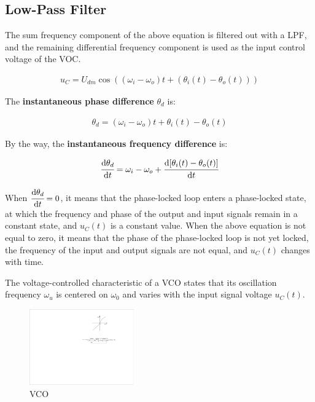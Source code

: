 \subsection*{Low-Pass Filter}

The sum frequency component of the above equation is filtered out with a LPF, and the remaining differential frequency component is used as the input control voltage of the VOC.

\begin{equation}
\begin{aligned}
    u_C=U_{dm}\cos{((\omega_i-\omega_o)t+(\theta_i(t)-\theta_o(t)))}
\end{aligned}
\end{equation}

The \textbf{instantaneous phase difference} $\theta_d$ is:

\begin{equation}
\begin{aligned}
    \theta_d=(\omega_i-\omega_o)t+\theta_i(t)-\theta_o(t)
\end{aligned}
\end{equation}

By the way, the \textbf{instantaneous frequency difference} is:

\begin{equation}
\begin{aligned}
    \cfrac{\mathrm{d} \theta_d}{\mathrm{d} t}=\omega_i-\omega_o+\cfrac{\mathrm{d} [\theta_i(t)-\theta_o(t)]}{\mathrm{d} t}
\end{aligned}
\end{equation}

When $\cfrac{\mathrm{d} \theta_d}{\mathrm{d} t}=0$, it means that the phase-locked loop enters a phase-locked state, at which the frequency and phase of the output and input signals remain in a constant state, and $u_C(t)$ is a constant value. When the above equation is not equal to zero, it means that the phase of the phase-locked loop is not yet locked, the frequency of the input and output signals are not equal, and $u_C(t)$ changes with time.

The voltage-controlled characteristic of a VCO states that its oscillation frequency $\omega_u$ is centered on $\omega_0$ and varies with the input signal voltage $u_C(t)$. 

\begin{figure}[H]
\centering
\includegraphics[width=0.4\textwidth]{./2023Mar/VCO.pdf}
\caption{VCO}
\label{VCO}
\end{figure}

